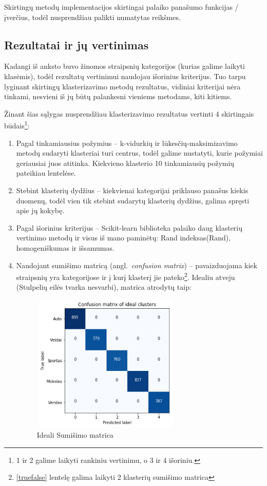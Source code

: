 \documentclass{VUMIFInfKursinis}
\newcommand{\ltang}[2]{#1 (angl.\  \textit{#2}) }
\begin{document}
Skirtingų metodų implementacijos skirtingai palaiko panašumo
funkcijas / įverčius, todėl nusprendžiau palikti numatytas reikšmes.





\subsection{Rezultatai ir jų vertinimas}

Kadangi iš anksto buvo žinomos straipsnių kategorijos (kurias galime
laikyti klasėmis), todėl rezultatų vertinimui naudojau išorinius
kriterijus. Tuo tarpu lyginant skirtingų klasterizavimo metodų
rezultatus, vidiniai kriterijai nėra tinkami, nesvieni iš jų būtų palankesni vieniems metodams, kiti kitiems.

Žinant šias sąlygas nusprendžiau klasterizavimo rezultatus vertinti 4
skirtingais būdais\footnote{1 ir 2 galime laikyti rankiniu vertinimu, o
  3 ir 4 išoriniu.}:

\begin{enumerate}
\item
  Pagal tinkamiausius požymius – k-vidurkių ir lūkesčių-maksimizavimo
  metodų sudaryti klasteriai turi centrus, todėl galime nustatyti, kurie
  požymiai geriausiai juos atitinka. Kiekvieno klasterio 10 tinkamiausių
  požymių pateikiau lentelėse.
\item
  Stebint klasterių dydžius – kiekvienai kategorijai priklauso panašus
  kiekis duomenų, todėl vien tik stebint sudarytų klasterių dydžius,
  galima spręsti apie jų kokybę.
\item
  Pagal išorinius kriterijus – Scikit-learn biblioteka palaiko daug
  klasterių vertinimo metodų ir visus iš mano paminėtų: Rand
  indeksas(Rand), homogeniškumas ir išsamumas.
\item
  Naudojant \ltang{sumišimo matricą}{confusion matrix} –
  pavaizduojama kiek straipsnių yra kategorijose ir į kurį klasterį jie
  pateko\footnote{\ref{truefalse} lentelę galima laikyti 2 klasterių sumišimo matrica}.
  Idealiu atveju (Stulpelių eilės tvarka nesvarbi), matrica atrodytų taip:
  \begin{figure}[H]
	\centering
	\includegraphics[width=2.7953in,height=2.5984in]{./Pictures/100002010000015E0000014D6F097C7C354B2FCC.png}
	\caption{Ideali Sumišimo matrica}
  \end{figure}
\end{enumerate}
\end{document}

